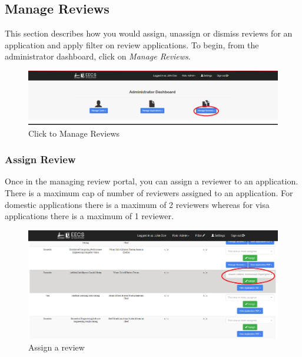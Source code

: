 \documentclass[fontsize=12pt,paper=letter,twoside]{scrartcl}
\begin{document}

\newpage
\clearpage
\subsection{Manage Reviews} \label{m_reviews}
This section describes how you would assign, unassign or dismiss reviews for an application and apply filter on review applications. To begin, from the administrator dashboard, click on \emph{Manage Reviews}.

\begin{figure}[!htb]
\begin{center}
\includegraphics[width=.99\textwidth]{images/adm/mr/manage_review.png}
\end{center}
\caption{Click to Manage Reviews}
\label{fig:adm/manage_review}
\end{figure}


\subsubsection{Assign Review}
Once in the managing review portal, you can assign a reviewer to an application. There is a maximum cap of number of reviewers assigned to an application. For domestic applications there is a maximum of 2 reviewers whereas for visa applications there is a maximum of 1 reviewer.

\begin{figure}[!htb]
\begin{center}
\includegraphics[width=.99\textwidth]{images/adm/mr/assign_review.png}
\end{center}
\caption{Assign a review}
\label{fig:adm/assign_review}
\end{figure}
\end{document}
